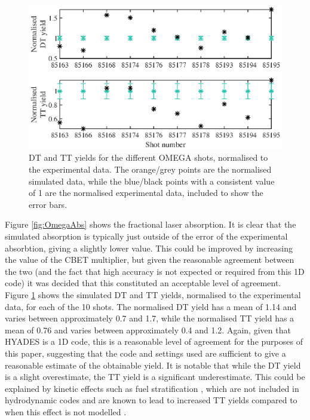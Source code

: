 \begin{figure}[ht]
\centering
\includegraphics{figures/LowCR/BenchmarkOmegaYield.eps}
\caption{DT and TT yields for the different OMEGA shots, normalised to the experimental data. The orange/grey points are the normalised simulated data, while the blue/black points with a consistent value of 1 are the normalised experimental data, included to show the error bars.}
\label{fig:OmegaYield}
\end{figure}

Figure \ref{fig:OmegaAbs} shows the fractional laser absorption. It is clear that the simulated absorption is typically just outside of the error of the experimental absorbtion, giving a slightly lower value. This could be improved by increasing the value of the CBET multiplier, but given the reasonable agreement between the two (and the fact that high accuracy is not expected or required from this 1D code) it was decided that this constituted an acceptable level of agreement. Figure \ref{fig:OmegaYield} shows the simulated DT and TT yields, normalised to the experimental data, for each of the 10 shots. The normalised DT yield has a mean of 1.14 and varies between approximately 0.7 and 1.7, while the normalised TT yield has a mean of 0.76 and varies between approximately 0.4 and 1.2. Again, given that HYADES is a 1D code, this is a reasonable level of agreement for the purposes of this paper, suggesting that the code and settings used are sufficient to give a reasonable estimate of the obtainable yield. It is notable that while the DT yield is a slight overestimate, the TT yield is a significant underestimate. This could be explained by kinetic effects such as fuel stratification \cite{Bellei2014}, which are not included in hydrodynamic codes and are known to lead to increased TT yields compared to when this effect is not modelled \cite{Casey2012}.

